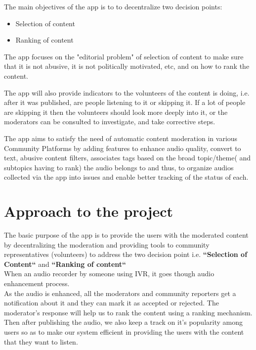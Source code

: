 \documentclass[11pt]{article}
\begin{document}
    The main objectives of the app is to to decentralize two decision points:
     \begin{itemize}
				\item
				        Selection of content
				\item
				        Ranking of content
			\end{itemize}
The app focuses on the "editorial problem" of selection of content to make sure that it is not abusive, it is not politically motivated, etc, and on how to rank the content.
\bigskip

The app will also provide indicators to the volunteers of the content is doing, i.e. after it was published, are people listening to it or skipping it. If a lot of people are skipping it then the volunteers should look more deeply into it, or the moderators can be consulted to investigate, and take corrective steps.

\bigskip

The app aims to satisfy the need of automatic content moderation in various Community Platforms by adding features to enhance audio quality, convert to text, abusive content filters, associates tags based on the broad topic/theme( and subtopics having to rank) the audio belongs to and thus, to organize audios collected via the app into issues and enable better tracking of the status of each.

\pagebreak
\section{Approach to the project}
    The basic purpose of the app is to provide the users with the moderated content by decentralizing the moderation and providing tools to community representatives (volunteers) to address the two decision point i.e. \textbf{``Selection of Content``} and \textbf{``Ranking of content``}\\
    \bigskip
    When an audio recorder by someone using IVR, it goes though audio enhancement process.\\
    As the audio is enhanced, all the moderators and community reporters get a notification about it and they can mark it as accepted or rejected. The moderator's response will help us to rank the content using a ranking mechanism. Then after publishing the audio, we also keep a track on it's popularity among users so as to make our system efficient in providing the users with the content that they want to listen.
\end{document}
